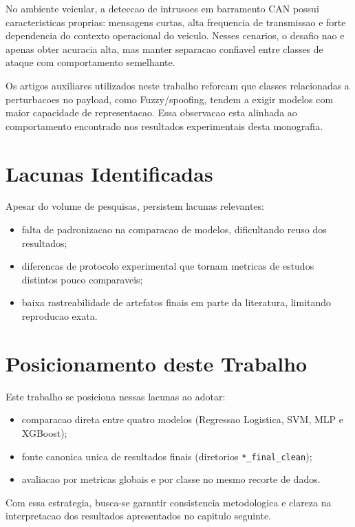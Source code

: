 No ambiente veicular, a deteccao de intrusoes em barramento CAN possui caracteristicas proprias: mensagens curtas, alta frequencia de transmissao e forte dependencia do contexto operacional do veiculo. Nesses cenarios, o desafio nao e apenas obter acuracia alta, mas manter separacao confiavel entre classes de ataque com comportamento semelhante.

Os artigos auxiliares utilizados neste trabalho reforcam que classes relacionadas a perturbacoes no payload, como Fuzzy/spoofing, tendem a exigir modelos com maior capacidade de representacao. Essa observacao esta alinhada ao comportamento encontrado nos resultados experimentais desta monografia.

\section{Lacunas Identificadas}

Apesar do volume de pesquisas, persistem lacunas relevantes:

\begin{itemize}
	\item falta de padronizacao na comparacao de modelos, dificultando reuso dos resultados;
	\item diferencas de protocolo experimental que tornam metricas de estudos distintos pouco comparaveis;
	\item baixa rastreabilidade de artefatos finais em parte da literatura, limitando reproducao exata.
\end{itemize}

\section{Posicionamento deste Trabalho}

Este trabalho se posiciona nessas lacunas ao adotar:

\begin{itemize}
	\item comparacao direta entre quatro modelos (Regressao Logistica, SVM, MLP e XGBoost);
	\item fonte canonica unica de resultados finais (diretorios \texttt{*\_final\_clean});
	\item avaliacao por metricas globais e por classe no mesmo recorte de dados.
\end{itemize}

Com essa estrategia, busca-se garantir consistencia metodologica e clareza na interpretacao dos resultados apresentados no capitulo seguinte.










